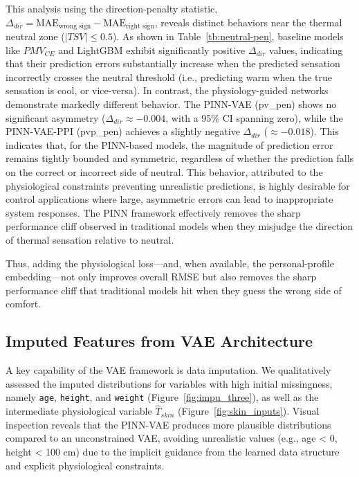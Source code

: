 This analysis using the direction-penalty statistic, $\Delta_{dir} = \text{MAE}_{\text{wrong sign}} - \text{MAE}_{\text{right sign}}$, reveals distinct behaviors near the thermal neutral zone ($|TSV| \le 0.5$). As shown in Table~\ref{tb:neutral-pen}, baseline models like $PMV_{CE}$ and LightGBM exhibit significantly positive $\Delta_{dir}$ values, indicating that their prediction errors substantially increase when the predicted sensation incorrectly crosses the neutral threshold (i.e., predicting warm when the true sensation is cool, or vice-versa). In contrast, the physiology-guided networks demonstrate markedly different behavior. The PINN-VAE (pv\_pen) shows no significant asymmetry ($\Delta_{dir} \approx -0.004$, with a 95\% CI spanning zero), while the PINN-VAE-PPI (pvp\_pen) achieves a slightly negative $\Delta_{dir}$ ($\approx -0.018$). This indicates that, for the PINN-based models, the magnitude of prediction error remains tightly bounded and symmetric, regardless of whether the prediction falls on the correct or incorrect side of neutral. This behavior, attributed to the physiological constraints preventing unrealistic predictions, is highly desirable for control applications where large, asymmetric errors can lead to inappropriate system responses\cite{Jain2018}. The PINN framework effectively removes the sharp performance cliff observed in traditional models when they misjudge the direction of thermal sensation relative to neutral.

Thus, adding the physiological loss—and, when available, the personal-profile embedding—not only improves overall RMSE but also removes the sharp performance cliff that traditional models hit when they guess the wrong side of comfort.

\subsection{Imputed Features from VAE Architecture}
A key capability of the VAE framework is data imputation. We qualitatively assessed the imputed distributions for variables with high initial missingness, namely \texttt{age}, \texttt{height}, and \texttt{weight} (Figure~\ref{fig:impu_three}), as well as the intermediate physiological variable $\hat{T}_{skin}$ (Figure~\ref{fig:skin_inputs}). Visual inspection reveals that the PINN-VAE produces more plausible distributions compared to an unconstrained VAE, avoiding unrealistic values (e.g., age < 0, height < 100 cm) due to the implicit guidance from the learned data structure and explicit physiological constraints.

